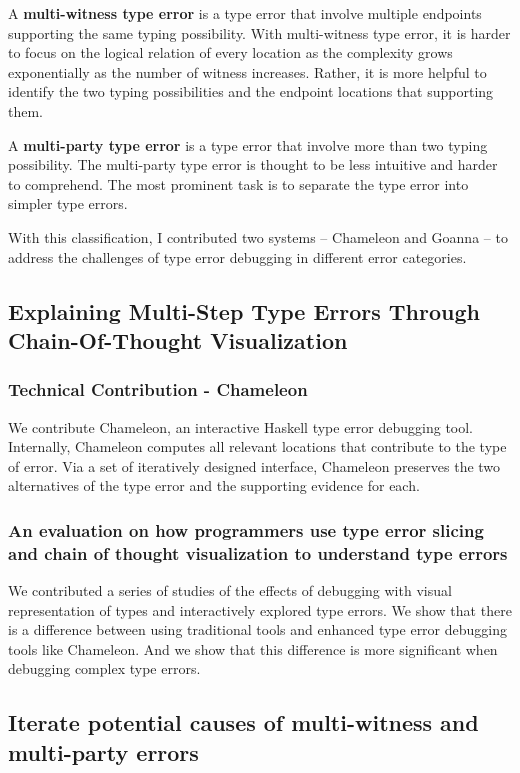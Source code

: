 A \textbf{multi-witness type error} is a type error that involve multiple endpoints supporting the same typing possibility. With multi-witness type error, it is harder to focus on the logical relation of every location as the complexity grows exponentially as the number of witness increases. Rather, it is more helpful to identify the two typing possibilities and the endpoint locations that supporting them.

A \textbf{multi-party type error} is a type error that involve more than two typing possibility. The multi-party type error is thought to be less intuitive and harder to comprehend. The most prominent task is to separate the type error into simpler type errors. 


With this classification, I contributed two systems -- Chameleon and Goanna -- to address the challenges of type error debugging in different error categories.

\subsection{Explaining Multi-Step Type Errors Through Chain-Of-Thought Visualization}

\subsubsection{Technical Contribution - Chameleon}
We contribute Chameleon, an interactive Haskell type error debugging tool. Internally, Chameleon computes all relevant locations that contribute to the type of error. Via a set of iteratively designed interface, Chameleon preserves the two alternatives of the type error and the supporting evidence for each.

\subsubsection{An evaluation on how programmers use type error slicing and chain of thought visualization to understand type errors}
We  contributed a series of studies of the effects of debugging with visual representation of types and interactively explored type errors. We show that there is a difference between using traditional tools and enhanced type error debugging tools like Chameleon. And we show that this difference is more significant when debugging complex type errors.

\subsection{Iterate potential causes of multi-witness and multi-party errors}

